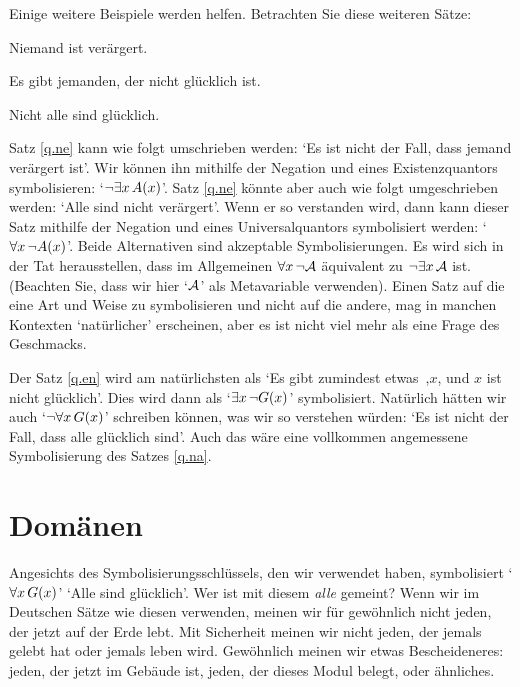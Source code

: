 Einige weitere Beispiele werden helfen. Betrachten Sie diese weiteren Sätze:
	\begin{earg}
		\item[\ex{q.ne}] Niemand ist verärgert.
		\item[\ex{q.en}] Es gibt jemanden, der nicht glücklich ist.
		\item[\ex{q.na}] Nicht alle sind glücklich.
	\end{earg}
Satz \ref{q.ne} kann wie folgt umschrieben werden: `Es ist nicht der Fall, dass jemand verärgert ist'. Wir können ihn mithilfe der Negation und eines Existenzquantors symbolisieren: `$\neg \exists x\, \mathord{A}(x)$'. Satz \ref{q.ne} könnte aber auch wie folgt umgeschrieben werden: `Alle sind nicht verärgert'. Wenn er so verstanden wird, dann kann dieser Satz mithilfe der Negation und eines Universalquantors symbolisiert werden: `$\forall x\, \neg \mathord{A}(x)$'. Beide Alternativen sind akzeptable Symbolisierungen. Es wird sich in der Tat herausstellen, dass im Allgemeinen $\forall x\, \neg \mathcal{A}$ äquivalent zu $\neg \exists x\, \mathcal{A}$ ist. (Beachten Sie, dass wir hier `$\mathcal{A}$' als Metavariable verwenden). Einen Satz auf die eine Art und Weise zu symbolisieren und nicht auf die andere, mag in manchen Kontexten `natürlicher' erscheinen, aber es ist nicht viel mehr als eine Frage des Geschmacks.

Der Satz \ref{q.en} wird am natürlichsten als `Es gibt zumindest etwas~,$x$, und $x$ ist nicht glücklich'. Dies wird dann als `$\exists x\, \neg \mathord{G}(x)$' symbolisiert. Natürlich hätten wir auch `$\neg \forall x\, \mathord{G}(x)$' schreiben können, was wir so verstehen würden: `Es ist nicht der Fall, dass alle glücklich sind'. Auch das wäre eine vollkommen angemessene Symbolisierung des Satzes \ref{q.na}.

\section{Domänen}
Angesichts des Symbolisierungsschlüssels, den wir verwendet haben, symbolisiert `$\forall x\,\mathord{G}(x)$' `Alle sind glücklich'. Wer ist mit diesem \emph{alle} gemeint? Wenn wir im Deutschen Sätze wie diesen verwenden, meinen wir für gewöhnlich nicht jeden, der jetzt auf der Erde lebt. Mit Sicherheit meinen wir nicht jeden, der jemals gelebt hat oder jemals leben wird. Gewöhnlich meinen wir etwas Bescheideneres: jeden, der jetzt im Gebäude ist, jeden, der dieses Modul belegt, oder ähnliches.

